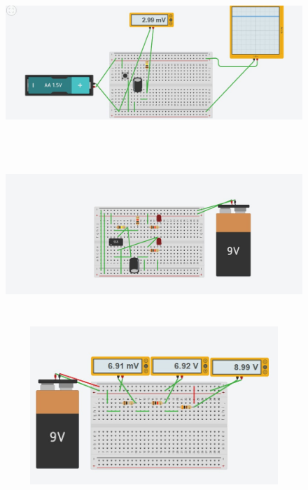 \documentclass[12pt,a4paper]{article}
\begin{document}
\newpage
\begin{figure}
	\begin{center}
		\includegraphics[width=12cm, height=6cm]{g9.png}
			\end{center}
				\end{figure}
\begin{figure}
	\begin{center}
		\includegraphics[width=12cm, height=6cm]{g10.png}
			\end{center}
				\end{figure}
\begin{figure}
	\begin{center}
		\includegraphics[width=12cm, height=6cm]{g11.png}
			\end{center}
				\end{figure}
				
\end{document}

